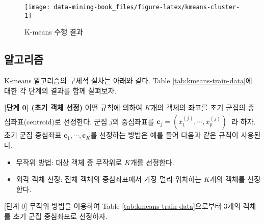 \documentclass[]{book}
\newenvironment{Shaded}{\begin{snugshade}}{\end{snugshade}}
\newcommand{\ControlFlowTok}[1]{\textcolor[rgb]{0.13,0.29,0.53}{\textbf{#1}}}
\newcommand{\DataTypeTok}[1]{\textcolor[rgb]{0.13,0.29,0.53}{#1}}
\newcommand{\DecValTok}[1]{\textcolor[rgb]{0.00,0.00,0.81}{#1}}
\newcommand{\KeywordTok}[1]{\textcolor[rgb]{0.13,0.29,0.53}{\textbf{#1}}}
\newcommand{\NormalTok}[1]{#1}
\newcommand{\OperatorTok}[1]{\textcolor[rgb]{0.81,0.36,0.00}{\textbf{#1}}}
\newcommand{\StringTok}[1]{\textcolor[rgb]{0.31,0.60,0.02}{#1}}
\providecommand{\tightlist}{%
  \setlength{\itemsep}{0pt}\setlength{\parskip}{0pt}}
\begin{document}
\begin{figure}

{\centering \texttt{[image: data-mining-book\_files/figure-latex/kmeans-cluster-1]} 

}

\caption{K-means 수행 결과}\label{fig:kmeans-cluster}
\end{figure}

\hypertarget{kmeans-algorithm}{%
\subsection{알고리즘}\label{kmeans-algorithm}}

K-means 알고리즘의 구체적 절차는 아래와 같다. Table \ref{tab:kmeans-train-data}에 대한 각 단계의 결과를 함께 살펴보자.

\textbf{{[}단계 0{]} (초기 객체 선정)} 어떤 규칙에 의하여 \(K\)개의 객체의 좌표를 초기 군집의 중심좌표(centroid)로 선정한다. 군집 \(j\)의 중심좌표를 \(\mathbf{c}_j = \left(\bar{x}^{(j)}_1, \cdots, \bar{x}^{(j)}_p\right)^\top\)라 하자. 초기 군집 중심좌표 \(\mathbf{c}_1, \cdots, \mathbf{c}_K\)를 선정하는 방법은 예를 들어 다음과 같은 규칙이 사용된다.

\begin{itemize}
\tightlist
\item
  무작위 방법: 대상 객체 중 무작위로 \(K\)개를 선정한다.
\item
  외각 객체 선정: 전체 객체의 중심좌표에서 가장 멀리 위치하는 \(K\)개의 객체를 선정한다.
\end{itemize}

{[}단계 0{]} 무작위 방법을 이용하여 Table \ref{tab:kmeans-train-data}으로부터 3개의 객체를 초기 군집 중심좌표로 선정하자.

\begin{Shaded}
\end{Shaded}
\end{document}
